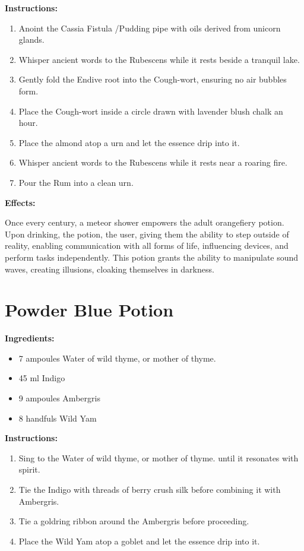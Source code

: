 \documentclass{article}
\begin{document}
\textbf{Instructions:}

\begin{enumerate}
  \item Anoint the Cassia Fistula /Pudding pipe with oils derived from unicorn glands.
  \item Whisper ancient words to the Rubescens while it rests beside a tranquil lake.
  \item Gently fold the Endive root into the Cough-wort, ensuring no air bubbles form.
  \item Place the Cough-wort inside a circle drawn with lavender blush chalk an hour.
  \item Place the almond atop a urn and let the essence drip into it.
  \item Whisper ancient words to the Rubescens while it rests near a roaring fire.
  \item Pour the Rum into a clean urn.
\end{enumerate}

\textbf{Effects:}

Once every century, a meteor shower empowers the adult orangefiery potion. Upon drinking, the potion, the user, giving them the ability to step outside of reality, enabling communication with all forms of life, influencing devices, and perform tasks independently. This potion grants the ability to manipulate sound waves, creating illusions, cloaking themselves in darkness.

\newpage
\section*{Powder Blue Potion}

\textbf{Ingredients:}

\begin{itemize}
  \item 7 ampoules Water of wild thyme, or mother of thyme.
  \item 45 ml Indigo
  \item 9 ampoules Ambergris
  \item 8 handfuls Wild Yam
\end{itemize}

\textbf{Instructions:}

\begin{enumerate}
  \item Sing to the Water of wild thyme, or mother of thyme. until it resonates with spirit.
  \item Tie the Indigo with threads of berry crush silk before combining it with Ambergris.
  \item Tie a goldring ribbon around the Ambergris before proceeding.
  \item Place the Wild Yam atop a goblet and let the essence drip into it.
\end{enumerate}
\end{document}
